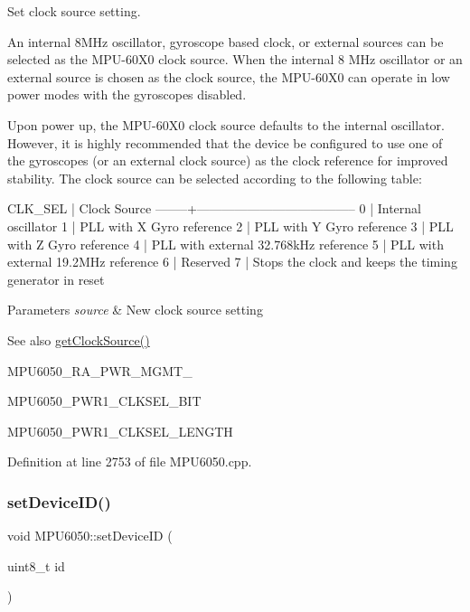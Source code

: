 Set clock source setting. 

An internal 8M\+Hz oscillator, gyroscope based clock, or external sources can be selected as the M\+P\+U-\/60\+X0 clock source. When the internal 8 M\+Hz oscillator or an external source is chosen as the clock source, the M\+P\+U-\/60\+X0 can operate in low power modes with the gyroscopes disabled.

Upon power up, the M\+P\+U-\/60\+X0 clock source defaults to the internal oscillator. However, it is highly recommended that the device be configured to use one of the gyroscopes (or an external clock source) as the clock reference for improved stability. The clock source can be selected according to the following table\+:


\begin{DoxyPre}
CLK\_SEL | Clock Source
--------+--------------------------------------
0       | Internal oscillator
1       | PLL with X Gyro reference
2       | PLL with Y Gyro reference
3       | PLL with Z Gyro reference
4       | PLL with external 32.768kHz reference
5       | PLL with external 19.2MHz reference
6       | Reserved
7       | Stops the clock and keeps the timing generator in reset
\end{DoxyPre}



\begin{DoxyParams}{Parameters}
{\em source} & New clock source setting \\
\hline
\end{DoxyParams}
\begin{DoxySeeAlso}{See also}
\mbox{\hyperlink{classMPU6050_a8ed670258a805807b5102cdc5d0996a8}{get\+Clock\+Source()}} 

M\+P\+U6050\+\_\+\+R\+A\+\_\+\+P\+W\+R\+\_\+\+M\+G\+M\+T\+\_ 

M\+P\+U6050\+\_\+\+P\+W\+R1\+\_\+\+C\+L\+K\+S\+E\+L\+\_\+\+B\+IT 

M\+P\+U6050\+\_\+\+P\+W\+R1\+\_\+\+C\+L\+K\+S\+E\+L\+\_\+\+L\+E\+N\+G\+TH 
\end{DoxySeeAlso}


Definition at line 2753 of file M\+P\+U6050.\+cpp.

\mbox{\label{classMPU6050_aaefb4b3d93cf4b78d56cd63b10ea0e97}} 
\subsubsection{\texorpdfstring{setDeviceID()}{setDeviceID()}}
{\footnotesize\ttfamily void M\+P\+U6050\+::set\+Device\+ID (\begin{DoxyParamCaption}\item[{uint8\+\_\+t}]{id }\end{DoxyParamCaption})}



